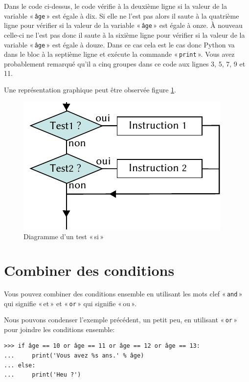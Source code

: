 Dans le code ci-dessus, le code vérifie à la deuxième ligne si la valeur de la variable « \texttt{âge} » est égale à dix.
Si elle ne l'est pas alors il saute à la quatrième ligne pour vérifier si 
la valeur de la variable « \texttt{âge} » est égale à onze. À nouveau  celle-ci     ne l'est pas donc il saute à la sixième ligne  pour vérifier si 
la valeur de la variable « \texttt{âge} » est égale à douze. Dans ce cas cela est le cas donc Python va dans le bloc à la septième ligne et exécute la commande « \texttt{print} ».
Vous avez probablement remarqué qu'il a cinq groupes dans ce code aux lignes 3, 5, 7, 9 et 11.

Une représentation graphique peut être observée figure \ref{fig:Cf-elif-fr}.

\begin{figure}[ht]
\centering
\includegraphics[scale=1.5]{images/Cf-elif-fr.pdf}
\caption{Diagramme d'un test « si »}
\label{fig:Cf-elif-fr}
\end{figure}

\section{Combiner des conditions}
Vous pouvez combiner des conditions ensemble en utilisant les mots clef « \texttt{and} » qui signifie « et » et « \texttt{or} » qui signifie « ou ».

Nous pouvons condenser l'exemple précédent, un petit peu, en utilisant « \texttt{or} » pour joindre les conditions ensemble:

\begin{Verbatim}[frame=single,rulecolor=\color{green}, label=à taper avec attention]
>>> if âge == 10 or âge == 11 or âge == 12 or âge == 13:
...     print('Vous avez %s ans.' % âge)
... else:
...     print('Heu ?')
\end{Verbatim}

